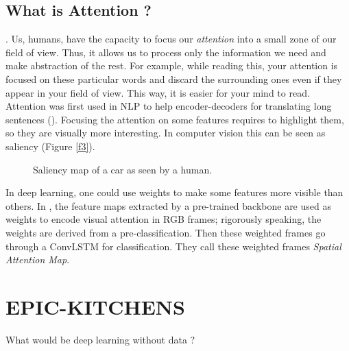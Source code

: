 \documentclass[12pt, a4paper]{report}
\begin{document}
	\subsection*{What is Attention ?}
	 \cite{sudhakaran}.
	Us, humans, have the capacity to focus our {\itshape attention} into a small zone of our field of view.
	Thus, it allows us to process only the information we need and make abstraction of the rest.
	For example, while reading this, your attention is focused on these particular words and discard the surrounding ones even if they appear in your field of view.
	This way, it is easier for your mind to read.
	Attention was first used in NLP to help encoder-decoders for translating long sentences (\cite{bahdanau}).
	Focusing the attention on some features requires to highlight them, so they are visually more interesting.
	In computer vision this can be seen as \gls{saliency} (Figure \ref{f3}).
	\begin{figure}[!tbp]
		\centering
		\caption{Saliency map of a car as seen by a human.}
	\end{figure}
	In deep learning, one could use weights to make some features more visible than others.
	In \cite{sudhakaran_lanz}, the feature maps extracted by a pre-trained backbone are used as weights to encode visual attention in RGB frames; rigorously speaking, the weights are derived from a pre-classification.
	Then these weighted frames go through a ConvLSTM for classification.
	They call these weighted frames {\itshape Spatial Attention Map}.\\

	\section{EPIC-KITCHENS}
	What would be deep learning without data ?
	
	
	
	\makeutbmbackcover{}
\end{document}
